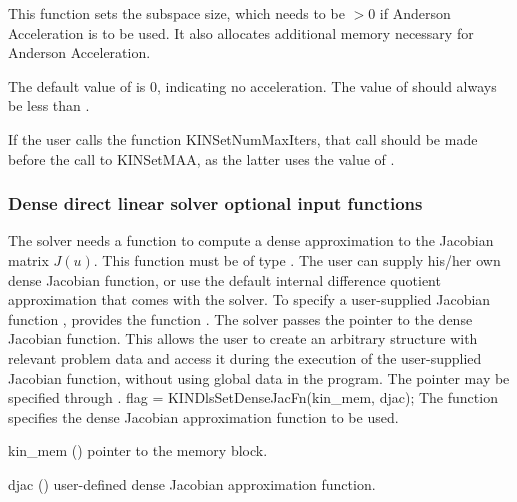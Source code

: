 {
  This function sets the subspace size, which needs to be $> 0$ if Anderson
  Acceleration is to be used.  
  It also allocates additional memory necessary for Anderson Acceleration.

  The default value of  is 0, indicating no acceleration.  The value of 
  should always be less than .

  If the user calls the function KINSetNumMaxIters, that call should be made
  before the call to KINSetMAA, as the latter uses the value of . 
}

\subsubsection{Dense direct linear solver optional input functions}\label{sss:optin_dls}
The 
{\kindense} solver needs a function to compute a dense approximation to
the Jacobian matrix $J(u)$.  This function must be of type . 
The user can supply his/her own dense Jacobian function, or use the default 
internal difference quotient approximation
that comes with the {\kindense} solver.
To specify a user-supplied Jacobian function , {\kindense} 
provides the function .
The {\kindense} solver passes the pointer  
to the dense Jacobian function. This allows the user to
create an arbitrary structure with relevant problem data and access it
during the execution of the user-supplied Jacobian function, without
using global data in the program.  The pointer  may be
specified through .
{
  flag = KINDlsSetDenseJacFn(kin\_mem, djac);
}
{
  The function  specifies the dense Jacobian
  approximation function to be used.
}
{
  \begin{args}
  \item[kin\_mem] ()
    pointer to the {\kinsol} memory block.
  \item[djac] ()
    user-defined dense Jacobian approximation function.
  \end{args}
}
